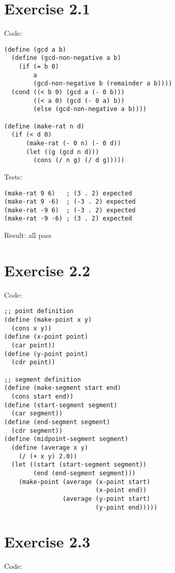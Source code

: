 \documentclass[../main.tex]{subfiles}
\begin{document}
\section{Exercise 2.1}

Code:

\begin{lstlisting}
(define (gcd a b)
  (define (gcd-non-negative a b)
    (if (= b 0)
        a
        (gcd-non-negative b (remainder a b))))
  (cond ((< b 0) (gcd a (- 0 b)))
        ((< a 0) (gcd (- 0 a) b))
        (else (gcd-non-negative a b))))

(define (make-rat n d)
  (if (< d 0)
      (make-rat (- 0 n) (- 0 d))
      (let ((g (gcd n d)))
        (cons (/ n g) (/ d g)))))
\end{lstlisting}

Tests:

\begin{lstlisting}
(make-rat 9 6)   ; (3 . 2) expected
(make-rat 9 -6)  ; (-3 . 2) expected
(make-rat -9 6)  ; (-3 . 2) expected
(make-rat -9 -6) ; (3 . 2) expected
\end{lstlisting}

Result: all pass

\section{Exercise 2.2}

Code:

\begin{lstlisting}
;; point definition
(define (make-point x y)
  (cons x y))
(define (x-point point)
  (car point))
(define (y-point point)
  (cdr point))

;; segment definition
(define (make-segment start end)
  (cons start end))
(define (start-segment segment)
  (car segment))
(define (end-segment segment)
  (cdr segment))
(define (midpoint-segment segment)
  (define (average x y)
    (/ (+ x y) 2.0))
  (let ((start (start-segment segment))
        (end (end-segment segment)))
    (make-point (average (x-point start)
                         (x-point end))
                (average (y-point start)
                         (y-point end)))))
\end{lstlisting}

\section{Exercise 2.3}

Code:
\end{document}
